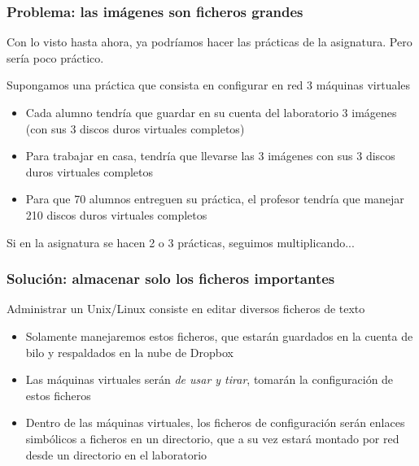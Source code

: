 \documentclass[ucs]{beamer}
\begin{document}
\begin{frame}[fragile]
\frametitle{Problema: las imágenes son ficheros grandes}
Con lo visto hasta ahora, ya podríamos hacer las prácticas de la 
asignatura. Pero sería poco práctico. 

Supongamos una práctica
que consista en configurar en red 3 máquinas virtuales
\begin{itemize}
\item
Cada alumno tendría que guardar en su cuenta del laboratorio 3 imágenes (con sus 3 discos duros virtuales completos)

\item
Para trabajar en casa, tendría que llevarse las 3 imágenes con sus 3 discos duros virtuales completos

\item
Para que 70 alumnos entreguen su práctica, el profesor tendría que manejar 210 discos duros virtuales completos
\end{itemize}

Si en la asignatura se hacen 2 o 3 prácticas, seguimos multiplicando...
\end{frame}

\begin{frame}[fragile]
\frametitle{Solución: almacenar solo los ficheros importantes}
Administrar un Unix/Linux consiste en editar diversos ficheros de texto

\begin{itemize}
\item
Solamente manejaremos estos ficheros, que estarán guardados en la cuenta
de bilo y respaldados en la nube de Dropbox
\item
Las máquinas virtuales serán \emph{de usar y tirar}, tomarán la configuración
de estos ficheros
\item
Dentro de las máquinas virtuales, los ficheros de configuración
serán enlaces simbólicos a ficheros en un directorio, que a su vez
estará montado por red desde un directorio en el laboratorio
\end{itemize}

\end{frame}
\end{document}
